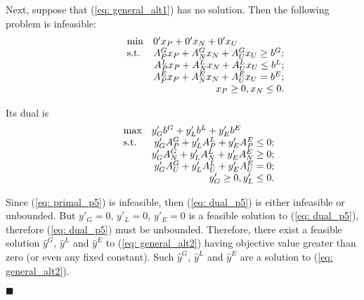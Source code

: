 Next, suppose that (\ref{eq: general_alt1}) has no solution. Then the following problem is infeasible:
\begin{equation}
\label{eq: primal_p5}
  \begin{array}{lrcll}
    \min
    & \multicolumn{4}{l}{0'x_P+0'x_N+0'x_U} \\
    \text{s.t.}
    & A^G_Px_P + A^G_Nx_N + A^G_Ux_U \geq b^G;\\
    & A^L_Px_P + A^L_Nx_N + A^L_Ux_U \leq b^L;\\
    & A^E_Px_P + A^E_Nx_N + A^E_Ux_U = b^E;\\
    & x_P\geq0, x_N\leq0.
  \end{array}
\end{equation}

Its dual is
\begin{equation}
\label{eq: dual_p5}
  \begin{array}{lrcll}
    \max
    & \multicolumn{4}{l}{y'_Gb^G +y'_Lb^L + y'_Eb^E} \\
    \text{s.t.}
    & y'_GA^G_P + y'_LA^L_P + y'_EA^E_P \leq 0;\\
    & y'_GA^G_N + y'_LA^L_N + y'_EA^E_N \geq 0;\\
    & y'_GA^G_U + y'_LA^L_U + y'_EA^E_U = 0;\\
    & y'_G\geq0, y'_L\leq0.
  \end{array}
\end{equation}

Since (\ref{eq: primal_p5}) is infeasible, then (\ref{eq: dual_p5}) is either infeasible or unbounded. But $y'_G=0$, $y'_L=0$, $y'_E=0$ is a feasible solution to (\ref{eq: dual_p5}), therefore (\ref{eq: dual_p5}) must be unbounded. Therefore, there exist a feasible solution $\widehat{y}^G$, $\widehat{y}^L$ and $\widehat{y}^E$ to (\ref{eq: general_alt2}) having objective value greater than zero (or even any fixed constant). Such $\widehat{y}^G$, $\widehat{y}^L$ and $\widehat{y}^E$ are a solution to (\ref{eq: general_alt2}).
\begin{flushright} $\blacksquare$ \end{flushright}